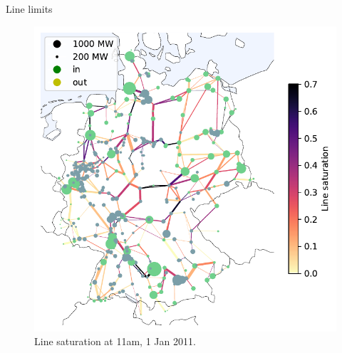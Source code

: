 \documentclass[10pt]{beamer}
\begin{document}
\begin{frame}{Line limits}
    \begin{figure}
    \includegraphics[height=.69\paperheight]{img/nominal_flow_and_injection.pdf}
    \caption{Line saturation at 11am, 1 Jan 2011.}
    \end{figure}
\end{frame}
\end{document}
